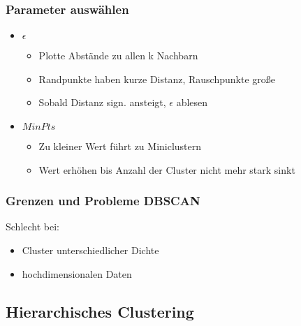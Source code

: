 \documentclass[a4paper]{article}
\begin{document}
\begin{landscape}
\begin{multicols}{3}
    \subsubsection{Parameter auswählen}
    \begin{itemize}[noitemsep,nolistsep]
        \item $\epsilon$
            \begin{itemize}[noitemsep,nolistsep]
                \item Plotte Abstände zu allen k Nachbarn
                \item Randpunkte haben kurze Distanz, Rauschpunkte große 
                \item Sobald Distanz sign. ansteigt, $\epsilon$ ablesen
            \end{itemize}
        \item $MinPts$
            \begin{itemize}[noitemsep,nolistsep]
                \item Zu kleiner Wert führt zu Miniclustern
                \item Wert erhöhen bis Anzahl der Cluster nicht mehr stark sinkt
            \end{itemize}
    \end{itemize}

    \subsubsection{Grenzen und Probleme DBSCAN}
    Schlecht bei:
    \begin{itemize}[noitemsep,nolistsep]
        \item Cluster unterschiedlicher Dichte
        \item hochdimensionalen Daten
    \end{itemize}


    \subsection{Hierarchisches Clustering}


\end{multicols}
\end{landscape}
\end{document}
